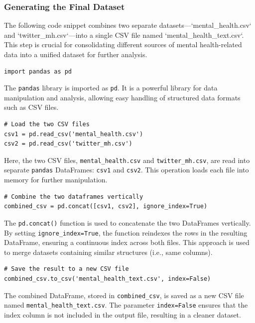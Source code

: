 \subsubsection{Generating the Final Dataset}

\noindent
The following code snippet combines two separate datasets—`mental\_health.csv` and `twitter\_mh.csv`—into a single CSV file named `mental\_health\_text.csv`. This step is crucial for consolidating different sources of mental health-related data into a unified dataset for further analysis.

\begin{verbatim}
import pandas as pd
\end{verbatim}

\noindent
The \texttt{pandas} library is imported as \texttt{pd}. It is a powerful library for data manipulation and analysis, allowing easy handling of structured data formats such as CSV files.

\begin{verbatim}
# Load the two CSV files
csv1 = pd.read_csv('mental_health.csv')
csv2 = pd.read_csv('twitter_mh.csv')
\end{verbatim}

\noindent
Here, the two CSV files, \texttt{mental\_health.csv} and \texttt{twitter\_mh.csv}, are read into separate \texttt{pandas} DataFrames: \texttt{csv1} and \texttt{csv2}. This operation loads each file into memory for further manipulation.

\begin{verbatim}
# Combine the two dataframes vertically
combined_csv = pd.concat([csv1, csv2], ignore_index=True)
\end{verbatim}

\noindent
The \texttt{pd.concat()} function is used to concatenate the two DataFrames vertically. By setting \texttt{ignore\_index=True}, the function reindexes the rows in the resulting DataFrame, ensuring a continuous index across both files. This approach is used to merge datasets containing similar structures (i.e., same columns).

\begin{verbatim}
# Save the result to a new CSV file
combined_csv.to_csv('mental_health_text.csv', index=False)
\end{verbatim}

\noindent
The combined DataFrame, stored in \texttt{combined\_csv}, is saved as a new CSV file named \texttt{mental\_health\_text.csv}. The parameter \texttt{index=False} ensures that the index column is not included in the output file, resulting in a cleaner dataset.

